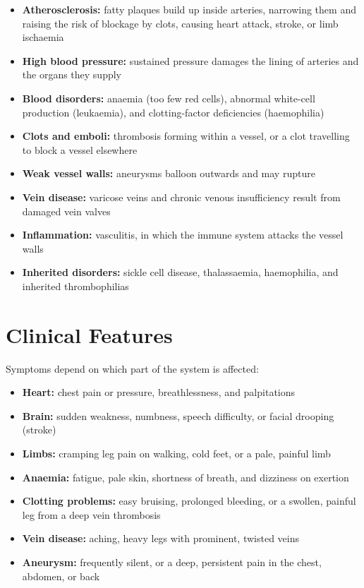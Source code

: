 \begin{itemize}
    \item \textbf{Atherosclerosis:} fatty plaques build up inside arteries, narrowing them and raising the risk of blockage by clots, causing heart attack, stroke, or limb ischaemia
    \item \textbf{High blood pressure:} sustained pressure damages the lining of arteries and the organs they supply
    \item \textbf{Blood disorders:} anaemia (too few red cells), abnormal white-cell production (leukaemia), and clotting-factor deficiencies (haemophilia)
    \item \textbf{Clots and emboli:} thrombosis forming within a vessel, or a clot travelling to block a vessel elsewhere
    \item \textbf{Weak vessel walls:} aneurysms balloon outwards and may rupture
    \item \textbf{Vein disease:} varicose veins and chronic venous insufficiency result from damaged vein valves
    \item \textbf{Inflammation:} vasculitis, in which the immune system attacks the vessel walls
    \item \textbf{Inherited disorders:} sickle cell disease, thalassaemia, haemophilia, and inherited thrombophilias
\end{itemize}

\section*{Clinical Features}
Symptoms depend on which part of the system is affected:

\begin{itemize}
    \item \textbf{Heart:} chest pain or pressure, breathlessness, and palpitations
    \item \textbf{Brain:} sudden weakness, numbness, speech difficulty, or facial drooping (stroke)
    \item \textbf{Limbs:} cramping leg pain on walking, cold feet, or a pale, painful limb
    \item \textbf{Anaemia:} fatigue, pale skin, shortness of breath, and dizziness on exertion
    \item \textbf{Clotting problems:} easy bruising, prolonged bleeding, or a swollen, painful leg from a deep vein thrombosis
    \item \textbf{Vein disease:} aching, heavy legs with prominent, twisted veins
    \item \textbf{Aneurysm:} frequently silent, or a deep, persistent pain in the chest, abdomen, or back
\end{itemize}

